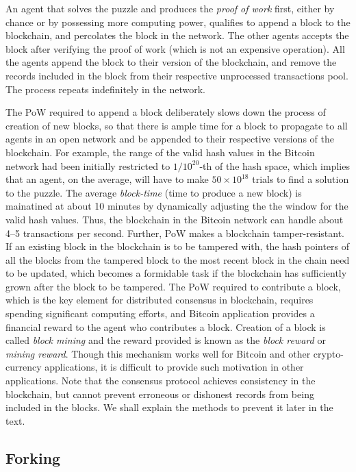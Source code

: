 An agent that solves the puzzle and produces the {\em proof of work} first, either by chance or by possessing more computing power, 
qualifies to append a block to the blockchain, and percolates the block in the network. The other agents accepts the block after
verifying the proof of work (which is not an expensive operation). All the agents append the block to their version of the blockchain, 
and remove the records included in the block from their respective unprocessed transactions pool. The process repeats indefinitely
in the network.

The PoW required to append a block deliberately slows down the process of creation of new blocks, so that there is ample time
for a block to propagate to all agents in an open network and be appended to their respective versions of the blockchain. 
For example, the range of the valid hash values in the Bitcoin network had been initially restricted to $1/10^{20}$-th of the 
hash space, which implies that an agent, on the average, will have to make $50 \times 10^{18}$ trials to find a solution to the 
puzzle. The average {\em block-time} (time to produce a new block) is mainatined at about 10 minutes by dynamically adjusting
the the window for the valid hash values. Thus, the blockchain in the Bitcoin network can handle about 4--5 transactions per 
second. 
%
Further, PoW makes a blockchain tamper-resistant. If an existing block in the blockchain is to be tampered with, the hash pointers 
of all the blocks from the tampered block to the most recent block in the chain need to be updated, which becomes a formidable task 
if the blockchain has sufficiently grown after the block to be tampered. 
%
  
The PoW required to contribute a block, which is the key element for distributed consensus in blockchain, requires spending significant 
computing efforts, and Bitcoin application provides a financial reward to the agent who contributes a block. Creation of a block is 
called {\em block mining} and the reward provided is known as the {\em block reward} or {\em mining reward}. Though this mechanism works 
well for Bitcoin and other crypto-currency applications, it is difficult to provide such motivation in other applications. 
%
Note that the consensus protocol achieves consistency in the blockchain, but cannot prevent erroneous or dishonest records from
being included in the blocks. We shall explain the methods to prevent it later in the text. 

\subsection{Forking}
\label{sec:ledger:forking}

